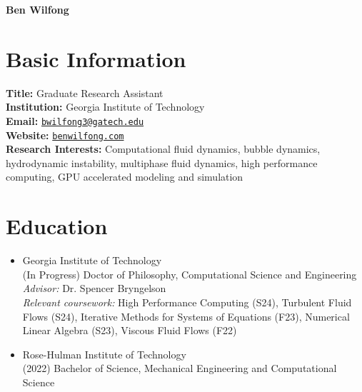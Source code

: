 \documentclass{article}
\begin{document}
\begin{center}
    \LARGE{\textbf{Ben Wilfong}}
\end{center}

\section{Basic Information}
\textbf{Title:} Graduate Research Assistant \\
\textbf{Institution:} Georgia Institute of Technology \\
\textbf{Email:} \href{mailto:bwilfong3@gatech.edu}{\texttt{bwilfong3@gatech.edu}} \\
\textbf{Website:} \href{https://benwilfong.com}{\texttt{benwilfong.com}} \\
\textbf{Research Interests:} Computational fluid dynamics, bubble dynamics, hydrodynamic instability, multiphase fluid dynamics, high performance computing, GPU accelerated modeling and simulation

\section{Education}
\begin{itemize}
    \item Georgia Institute of Technology \\
    \hspace*{0.25cm} (In Progress) Doctor of Philosophy, Computational Science and Engineering \\
    \hspace*{2.4cm} \textit{Advisor:} Dr. Spencer Bryngelson \\
    \hspace*{2.4cm} \textit{Relevant coursework:} High Performance Computing (S24), Turbulent Fluid 
    \hspace*{2.4cm} Flows (S24), Iterative Methods for Systems of Equations (F23), Numerical 
    \hspace*{2.4cm} Linear Algebra (S23), Viscous Fluid Flows (F22) \\
    \item Rose-Hulman Institute of Technology \\
    \hspace*{0.25cm} (2022) Bachelor of Science, Mechanical Engineering and Computational Science
\end{itemize}
\end{document}
